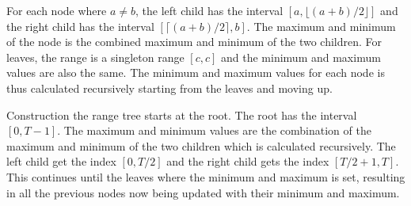For each node where $a \neq b$, the left child has the interval $[a, \lfloor
(a+b)/2 \rfloor]$ and the right child has the interval $[\lceil
(a+b)/2 \rceil, b]$. The maximum and minimum of the node is the combined maximum
and minimum of the two children. For leaves, the range is a singleton range
$[c,c]$ and the minimum and maximum values are also the same. The minimum and
maximum values for each node is thus calculated recursively starting from the
leaves and moving up. 

Construction the range tree starts at the root. The root has the interval
$[0,T-1]$. The maximum and minimum values are the combination of the maximum and
minimum of the two children which is calculated recursively. The left child get
the index $[0, T/2]$ and the right child gets the index $[T/2 + 1, T]$. This
continues until the leaves where the minimum and maximum is set, resulting in
all the previous nodes now being updated with their minimum and maximum. 


